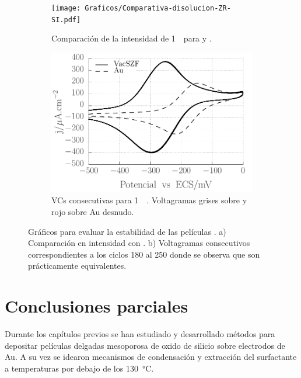 		 			\begin{figure}[th]
			   	    \begin{subfigure}[t]{0.495\textwidth}
			        	\texttt{[image: Graficos/Comparativa-disolucion-ZR-SI.pdf]}
			        	\vspace*{-0.40cm}\caption{Comparación de la intensidad de \ru\space \SI{1}{\milli\Molar}para \pdmF\space y \pdmZ.}
			        	\label{fig:zr-comp-a}
			         	\end{subfigure}
			     		\begin{subfigure}[t]{0.495\textwidth}
			        	\includegraphics[width=1\textwidth]{Graficos/Zr-Ru1mM-181-246Ciclos.pdf}
			        	\vspace*{-0.40cm}\caption{VCs consecutivas para  \ru\space \SI{1}{\milli\Molar}. Voltagramas grises sobre \pdmZ\space y rojo sobre Au desnudo.}
			        	\label{fig:zr-comp-b}
			         	\end{subfigure}
			         	\caption[Estabilidad de las \pdmZ]{Gráficos para evaluar la estabilidad de las películas \pdmZ\space. a) Comparación en intensidad con \pdmF. b) Voltagramas consecutivos correspondientes a los ciclos 180 al 250 donde se observa que son prácticamente equivalentes.}
			         	\label{fig:zr-comp}
			     	\end{figure}		

\section{Conclusiones parciales}
	
	Durante los capítulos previos se han estudiado y desarrollado métodos para depositar películas delgadas mesoporosa de oxido de silicio sobre electrodos de Au. A su vez se idearon mecanismos de condensación y extracción del surfactante a temperaturas por debajo de los \SI{130}{\celsius}. 

